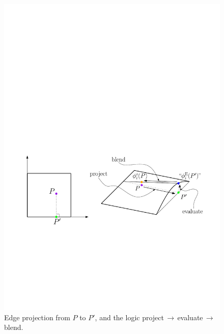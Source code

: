 \begin{figure}[!ht]
\begin{center}
\includegraphics[scale=0.55]{./figures/QuadProjection.pdf}
\caption{Edge projection from $P$ to $P'$, and the logic project$\,\to\,$evaluate$\,\to\,$blend.}
\label{fig:QuadProjection}
\end{center}
\end{figure}

